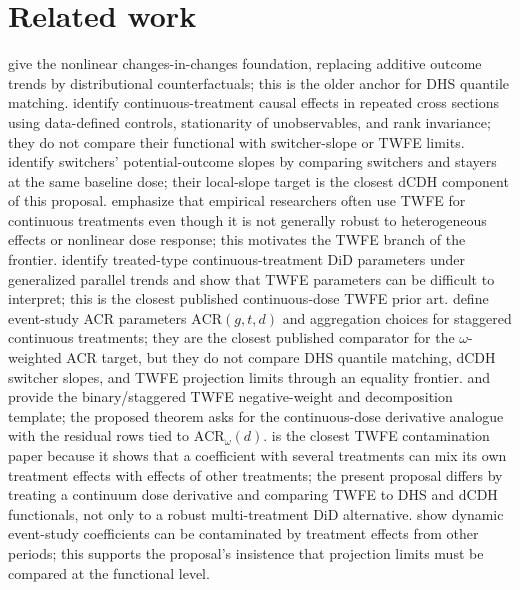 \documentclass[11pt]{article}
\theoremstyle{definition}
\theoremstyle{plain}
\theoremstyle{remark}
\begin{document}
\section{Related work}
\citet{AtheyImbens2006} give the nonlinear changes-in-changes foundation, replacing additive outcome trends by distributional counterfactuals; this is the older anchor for DHS quantile matching.
\citet{DHaultfoeuilleHoderleinSasaki2023} identify continuous-treatment causal effects in repeated cross sections using data-defined controls, stationarity of unobservables, and rank invariance; they do not compare their functional with switcher-slope or TWFE limits.
\citet{deChaisemartinDHaultfoeuillePasquierSowVazquezBare2025} identify switchers' potential-outcome slopes by comparing switchers and stayers at the same baseline dose; their local-slope target is the closest dCDH component of this proposal.
\citet{deChaisemartinDHaultfoeuilleVazquezBare2024} emphasize that empirical researchers often use TWFE for continuous treatments even though it is not generally robust to heterogeneous effects or nonlinear dose response; this motivates the TWFE branch of the frontier.
\citet{CallawayGoodmanBaconSantAnna2024} identify treated-type continuous-treatment DiD parameters under generalized parallel trends and show that TWFE parameters can be difficult to interpret; this is the closest published continuous-dose TWFE prior art.
\citet{CallawayGoodmanBaconSantAnna2024EventStudies} define event-study ACR parameters \(\mathrm{ACR}(g,t,d)\) and aggregation choices for staggered continuous treatments; they are the closest published comparator for the \(\omega\)-weighted ACR target, but they do not compare DHS quantile matching, dCDH switcher slopes, and TWFE projection limits through an equality frontier.
\citet{deChaisemartinDHaultfoeuille2020} and \citet{GoodmanBacon2021} provide the binary/staggered TWFE negative-weight and decomposition template; the proposed theorem asks for the continuous-dose derivative analogue with the residual rows tied to \(\mathrm{ACR}_\omega(d)\).
\citet{deChaisemartinDHaultfoeuille2023SeveralTreatments} is the closest TWFE contamination paper because it shows that a coefficient with several treatments can mix its own treatment effects with effects of other treatments; the present proposal differs by treating a continuum dose derivative and comparing TWFE to DHS and dCDH functionals, not only to a robust multi-treatment DiD alternative.
\citet{SunAbraham2021} show dynamic event-study coefficients can be contaminated by treatment effects from other periods; this supports the proposal's insistence that projection limits must be compared at the functional level.
\end{document}
